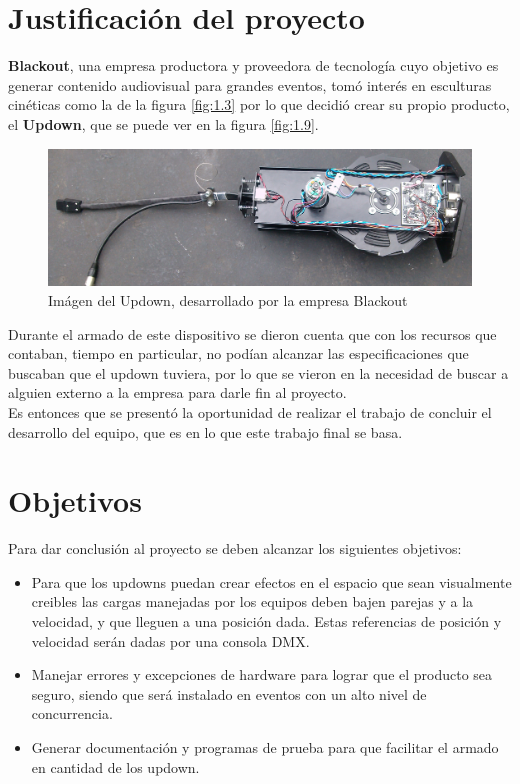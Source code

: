 \section{Justificación del proyecto}
\textbf{Blackout}, una empresa productora y proveedora de tecnología cuyo objetivo es generar contenido audiovisual para grandes eventos, tomó interés en esculturas cinéticas como la de la figura \ref{fig:1.3} por lo que decidió crear su propio producto, el \textbf{Updown}, que se puede ver en la figura \ref{fig:1.9}. \\

\begin{figure}[!ht]
	\centering
	\includegraphics[width=15cm,scale=1]{resources/1_9-updown.jpg}
	\caption{Imágen del Updown, desarrollado por la empresa Blackout}
	\label{fig:\thefigure}
\end{figure}

Durante el armado de este dispositivo se dieron cuenta que con los recursos que contaban, tiempo en particular, no podían alcanzar las especificaciones que buscaban que el updown tuviera, por lo que se vieron en la necesidad de buscar a alguien externo a la empresa para darle fin al proyecto.\\

Es entonces que se presentó la oportunidad de realizar el trabajo de concluir el desarrollo del equipo, que es en lo que este trabajo final se basa.

\section{Objetivos}
Para dar conclusión al proyecto se deben alcanzar los siguientes objetivos:
\begin{itemize}
	\item Para que los updowns puedan crear efectos en el espacio que sean visualmente creibles las cargas manejadas por los equipos deben bajen parejas y a la velocidad, y que lleguen a una posición dada. Estas referencias de posición y velocidad serán dadas por una consola DMX.
	\item Manejar errores y excepciones de hardware para lograr que el producto sea seguro, siendo que será instalado en eventos con un alto nivel de concurrencia.
	\item Generar documentación y programas de prueba para que facilitar el armado en cantidad de los updown.
\end{itemize}


